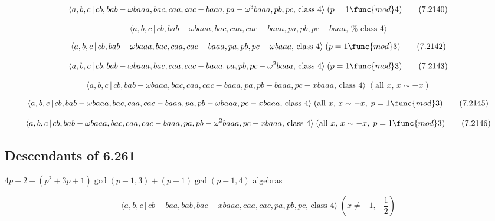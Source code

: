 \documentclass[10pt]{article}
\begin{document}
\begin{equation}
\langle a,b,c\,|\,cb,bab-\omega baaa,bac,caa,cac-baaa,pa-\omega
^{3}baaa,pb,pc,\,\text{class }4\rangle \;(p=1\func{mod}4)  \tag{7.2140}
\end{equation}

\begin{equation}
\langle a,b,c\,|\,cb,bab-\omega baaa,bac,caa,cac-baaa,pa,pb,pc-baaa,\,\text{%
class }4\rangle  \tag{7.2141}
\end{equation}

\begin{equation}
\langle a,b,c\,|\,cb,bab-\omega baaa,bac,caa,cac-baaa,pa,pb,pc-\omega baaa,\,%
\text{class }4\rangle \;(p=1\func{mod}3)  \tag{7.2142}
\end{equation}

\begin{equation}
\langle a,b,c\,|\,cb,bab-\omega baaa,bac,caa,cac-baaa,pa,pb,pc-\omega
^{2}baaa,\,\text{class }4\rangle \;(p=1\func{mod}3)  \tag{7.2143}
\end{equation}

\begin{equation}
\langle a,b,c\,|\,cb,bab-\omega baaa,bac,caa,cac-baaa,pa,pb-baaa,pc-xbaaa,\,%
\text{class }4\rangle \;(\text{all }x,\,x\sim -x)  \tag{7.2144}
\end{equation}

\begin{equation}
\langle a,b,c\,|\,cb,bab-\omega baaa,bac,caa,cac-baaa,pa,pb-\omega
baaa,pc-xbaaa,\,\text{class }4\rangle \;(\text{all }x,\,x\sim -x,\;p=1\func{%
mod}3)  \tag{7.2145}
\end{equation}

\begin{equation}
\langle a,b,c\,|\,cb,bab-\omega baaa,bac,caa,cac-baaa,pa,pb-\omega
^{2}baaa,pc-xbaaa,\,\text{class }4\rangle \;(\text{all }x,\,x\sim -x,\;p=1%
\func{mod}3)  \tag{7.2146}
\end{equation}

\subsection{Descendants of 6.261}

$4p+2+(p^{2}+3p+1)\gcd (p-1,3)+(p+1)\gcd (p-1,4)$ algebras

\begin{equation}
\langle a,b,c\,|\,cb-baa,bab,bac-xbaaa,caa,cac,pa,pb,pc,\,\text{class }%
4\rangle \;(x\neq -1,-\frac{1}{2})  \tag{7.2147}
\end{equation}
\end{document}
